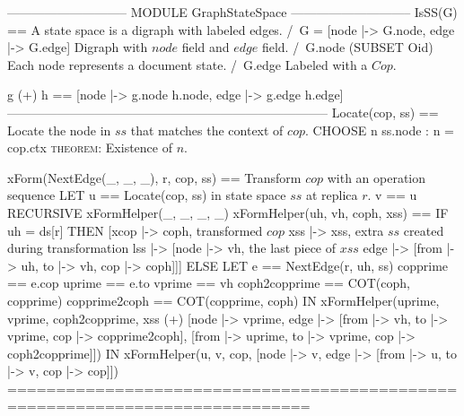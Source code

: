 \documentclass{article}
\begin{document}
\begin{tla}
----------------------------- MODULE GraphStateSpace -----------------------------
IsSS(G) == \* A state space is a digraph with labeled edges.
    /\ G = [node |-> G.node, edge |-> G.edge] \* Digraph with $node$ field and $edge$ field.
    /\ G.node \subseteq (SUBSET Oid) \* Each node represents a document state.
    /\ G.edge  \* Labeled with a $Cop$.

g (+) h == [node |-> g.node \cup h.node, edge |-> g.edge \cup h.edge]
-----------------------------------------------------------------------------
Locate(cop, ss) == \* Locate the node in $ss$ that matches the context of $cop$.     
    CHOOSE n \in ss.node : n = cop.ctx \* \textsc{theorem}: Existence of $n$.

xForm(NextEdge(_, _, _), r, cop, ss) == \* Transform $cop$ with an operation sequence 
    LET u == Locate(cop, ss)            \* in state space $ss$ at replica $r$.
        v == u 
        RECURSIVE xFormHelper(_, _, _, _)
        xFormHelper(uh, vh, coph, xss) == 
            IF uh = ds[r] 
            THEN [xcop |-> coph, \* transformed $cop$
                  xss |-> xss,   \* extra $ss$ created during transformation
                  lss |-> [node |-> {vh}, \* the last piece of $xss$
                           edge |-> {[from |-> uh, to |-> vh, cop |-> coph]}]]
            ELSE LET e == NextEdge(r, uh, ss)
                     copprime == e.cop
                     uprime == e.to
                     vprime == vh 
                      coph2copprime == COT(coph, copprime)
                     copprime2coph == COT(copprime, coph)
                 IN  xFormHelper(uprime, vprime, coph2copprime,
                        xss (+) [node |-> {vprime},
                                 edge |-> {[from |-> vh, to |-> vprime, 
                                             cop |-> copprime2coph], 
                                           [from |-> uprime, to |-> vprime, 
                                             cop |-> coph2copprime]}])
    IN  xFormHelper(u, v, cop, [node |-> {v}, 
                                edge |-> {[from |-> u, to |-> v, cop |-> cop]}])  
=============================================================================
\end{tla}
\end{document}
